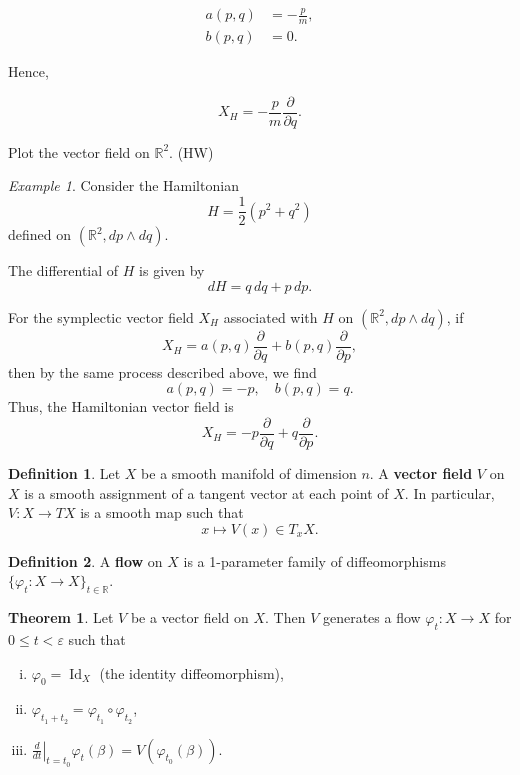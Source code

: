 \documentclass[11pt]{article}
\theoremstyle{definition}
\newtheorem{definition}{Definition}[section]
\newtheorem{theorem}{Theorem}[section]
\theoremstyle{remark}
\newtheorem{example}{Example}[section]
\begin{document}
\[
\begin{aligned}
    a(p,q) &= -\frac{p}{m}, \\
    b(p,q) &= 0.
\end{aligned}
\]

Hence,

\[
X_H = -\frac{p}{m} \frac{\partial}{\partial q}.
\]

Plot the vector field on \(\mathbb{R}^2\). (HW)

\begin{example}\label{ex:ham_operator}
Consider the Hamiltonian
\[
H = \frac{1}{2}(p^2 + q^2)
\]
defined on \((\mathbb{R}^2, dp \wedge dq)\).

The differential of \(H\) is given by
\[
dH = q \, dq + p \, dp.
\]

For the symplectic vector field \(X_H\) associated with \(H\) on \((\mathbb{R}^2, dp \wedge dq)\), if
\[
X_H = a(p,q) \frac{\partial}{\partial q} + b(p,q) \frac{\partial}{\partial p},
\]
then by the same process described above, we find
\[
a(p,q) = -p, \quad b(p,q) = q.
\]
Thus, the Hamiltonian vector field is
\[
X_H = -p \frac{\partial}{\partial q} + q \frac{\partial}{\partial p}.
\]
\end{example}

\begin{definition}\label{def:vector_field_manifold}
Let $X$ be a smooth manifold of dimension $n$. A \textbf{vector field} $V$ on $X$ is a smooth assignment of a tangent vector at each point of $X$. In particular, $V \colon X \to TX$ is a smooth map such that
\[
x \mapsto V(x) \in T_x X.
\]
\end{definition}

\begin{definition}\label{def:flow}
A \textbf{flow} on $X$ is a 1-parameter family of diffeomorphisms $\{\varphi_t \colon X \to X\}_{t \in \mathbb{R}}$.
\end{definition}

\begin{theorem}\label{thm:flow_generation}
Let $V$ be a vector field on $X$. Then $V$ generates a flow $\varphi_t \colon X \to X$ for $0 \leq t < \varepsilon$ such that
\begin{enumerate}[(i)]
    \item $\varphi_0 = \operatorname{Id}_X$ (the identity diffeomorphism),
    \item $\varphi_{t_1 + t_2} = \varphi_{t_1} \circ \varphi_{t_2}$,
    \item $\left.\frac{d}{dt}\right|_{t=t_0} \varphi_t(\beta) = V(\varphi_{t_0}(\beta))$.
\end{enumerate}
\end{theorem}
\end{document}
